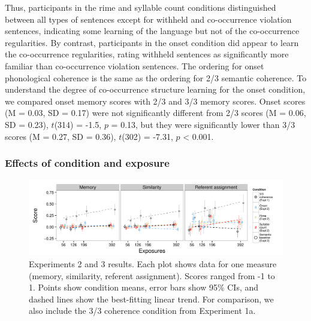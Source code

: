 \documentclass[man,floatsintext]{apa6}
\begin{document}
\noindent Thus, participants in the rime and syllable count conditions distinguished between all types of sentences except for withheld and co-occurrence violation sentences, indicating some learning of the language but not of the co-occurrence regularities. By contrast, participants in the onset condition did appear to learn the co-occurrence regularities, rating withheld sentences as significantly more familiar than co-occurrence violation sentences. The ordering for onset phonological coherence is the same as the ordering for 2/3 semantic coherence. To understand the degree of co-occurrence structure learning for the onset condition, we compared onset memory scores with 2/3 and 3/3 memory scores. Onset scores (M = 0.03, SD = 0.17) were not significantly different from 2/3 scores (M = 0.06, SD = 0.23), $t$(314) = -1.5, $p$ = 0.13, but they were significantly lower than 3/3 scores (M = 0.27, SD = 0.36), $t$(302) = -7.31, $p$ < 0.001.

\subsubsection{Effects of condition and exposure}

\begin{figure}[t]
  \begin{center}
    \includegraphics[width=1.0\linewidth]{x23}
    \caption{Experiments 2 and 3 results. Each plot shows data for one measure (memory, similarity, referent assignment). Scores ranged from -1 to 1. Points show condition means, error bars show 95\% CIs, and dashed lines show the best-fitting linear trend. For comparison, we also include the 3/3 coherence condition from Experiment 1a.}
    \label{expt23-results}
  \end{center}
\end{figure}
\end{document}
